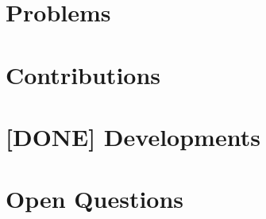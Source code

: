 

\chapter{Problems}


\chapter{Contributions}


\chapter{[DONE] Developments}


\chapter{Open Questions}

